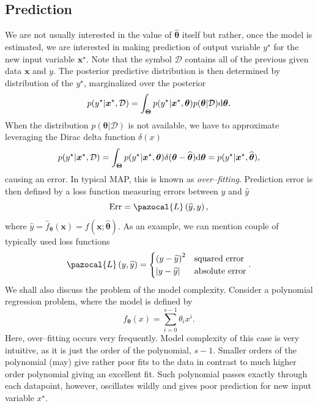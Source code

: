 \subsection{Prediction}
We are not usually interested in the value of $\widehat{\boldsymbol{\theta}}$ itself but rather, once the model is estimated, we are interested in making prediction of output variable $y^{\star}$ for the new input variable $\boldsymbol{x}^{\star}$. Note that the symbol $\mathcal{D}$ contains all of the previous given data $\boldsymbol{x}$ and $y$. The posterior predictive distribution is then determined by distribution of the $y^{\star}$, marginalized over the posterior
\begin{equation}
	p(y^{\star} | \boldsymbol{x}^{\star}, \mathcal{D}) =   \int_{\boldsymbol{\Theta}} p(y^{\star}|\boldsymbol{x}^{\star}, \boldsymbol{\theta}) p(\boldsymbol{\theta}|\mathcal{D}) \mathrm{d}\boldsymbol{\theta}.
\end{equation} 
When the distribution $p(\boldsymbol{\theta}|\mathcal{D})$ is not available, we have to approximate leveraging the Dirac delta function $\delta(x)$  
\begin{equation}
p(y^{\star} | \boldsymbol{x}^{\star}, \mathcal{D}) = \int_{\boldsymbol{\Theta}} 	p(y^{\star}|\boldsymbol{x}^{\star}, \boldsymbol{\theta}) \delta(\boldsymbol{\theta} - \widehat{\boldsymbol{\theta}})\mathrm{d}\boldsymbol{\theta} = p(y^{\star}|\boldsymbol{x}^{\star}, \widehat{\boldsymbol{\theta}}),
\end{equation}
causing an error. In typical MAP, this is known as \emph{over--fitting}. Prediction error is then defined by a loss function measuring errors between $y$ and $\widehat{y}$
\begin{equation}
	\mathrm{Err} = \pazocal{L}\left(\widehat{y}, y \right),
\end{equation}	
where $\widehat{y} = \widehat{f}_{\boldsymbol{\theta}}\left(\boldsymbol{x}\right) = f(\boldsymbol{x}; \widehat{\boldsymbol{\theta}})$.  As an example, we can mention couple of typically used loss functions 
\begin{equation}
\pazocal{L}\left(y,\widehat{y} \right) =
 \begin{cases}
	 \left(y - \widehat{y}\right)^2& \text{squared error}\\
	 \abs{y - \widehat{y}} & \text{absolute error}\\
\end{cases}   .
\end{equation}
We shall also discuss the problem of the model complexity. Consider a polynomial regression problem,  where the model is defined by
\begin{equation}
	f_{\boldsymbol{\theta}}(x) = \sum_{i=0}^{s-1}\theta_ix^i.
\end{equation}
 Here, over--fitting occurs very frequently. Model complexity of this case is very intuitive, as it is just the order of the polynomial, $s-1$.  Smaller orders of the polynomial (may) give rather poor fits to the data in contrast to much higher order polynomial giving an excellent fit. Such polynomial passes exactly through each datapoint, however, oscillates wildly and gives poor prediction for new input variable $x^{\star}$. 
 
